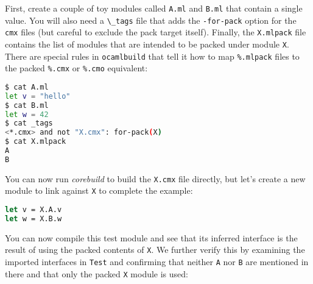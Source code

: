 First, create a couple of toy modules called
\passthrough{\lstinline!A.ml!} and \passthrough{\lstinline!B.ml!} that
contain a single value. You will also need a
\passthrough{\lstinline!\_tags!} file that adds the
\passthrough{\lstinline!-for-pack!} option for the
\passthrough{\lstinline!cmx!} files (but careful to exclude the pack
target itself). Finally, the \passthrough{\lstinline!X.mlpack!} file
contains the list of modules that are intended to be packed under module
\passthrough{\lstinline!X!}. There are special rules in
\passthrough{\lstinline!ocamlbuild!} that tell it how to map
\passthrough{\lstinline!\%.mlpack!} files to the packed
\passthrough{\lstinline!\%.cmx!} or \passthrough{\lstinline!\%.cmo!}
equivalent:

\begin{lstlisting}[language=bash]
$ cat A.ml
let v = "hello"
$ cat B.ml
let w = 42
$ cat _tags
<*.cmx> and not "X.cmx": for-pack(X)
$ cat X.mlpack
A
B
\end{lstlisting}

You can now run \emph{corebuild} to build the
\passthrough{\lstinline!X.cmx!} file directly, but let's create a new
module to link against \passthrough{\lstinline!X!} to complete the
example:

\begin{lstlisting}[language=Caml]
let v = X.A.v
let w = X.B.w
\end{lstlisting}

You can now compile this test module and see that its inferred interface
is the result of using the packed contents of
\passthrough{\lstinline!X!}. We further verify this by examining the
imported interfaces in \passthrough{\lstinline!Test!} and confirming
that neither \passthrough{\lstinline!A!} nor \passthrough{\lstinline!B!}
are mentioned in there and that only the packed
\passthrough{\lstinline!X!} module is used:

